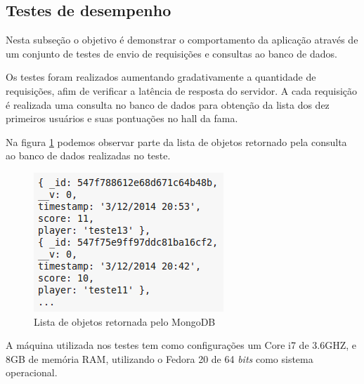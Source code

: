 \subsection{Testes de desempenho}
\label{subsec: Testes de desempenho}
Nesta subseção o objetivo é demonstrar o comportamento da aplicação através de um conjunto de testes de envio de requisições e consultas ao banco de dados. 

Os testes foram realizados aumentando gradativamente a quantidade de requisições, afim de verificar a latência de resposta do servidor. A cada requisição é realizada uma consulta no banco de dados para obtenção da lista dos dez primeiros usuários e suas pontuações no hall da fama.

Na figura \ref{fig: Lista de objetos retornada pelo MongoDB} podemos observar parte da lista de objetos retornado pela consulta ao banco de dados realizadas no teste.

    \begin{figure}[htb]
    \centering
    \includegraphics[scale=0.7]{images/objs_hof_bd.png}
    \caption{Lista de objetos retornada pelo MongoDB}
    \label{fig: Lista de objetos retornada pelo MongoDB}
    \end{figure}


A máquina utilizada nos testes tem como configurações um Core i7 de 3.6GHZ, e 8GB de memória RAM, utilizando o Fedora 20 de 64 \textit{bits} como sistema operacional.

